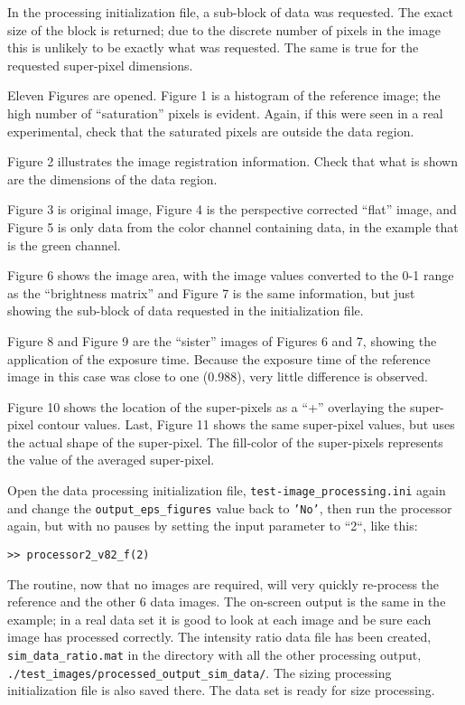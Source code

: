 In the processing initialization file, a sub-block of data was requested.  The exact size of the block is returned; due to the discrete number of pixels in the image this is unlikely to be exactly what was requested.  The same is true for the requested super-pixel dimensions.  

Eleven Figures are opened.  Figure 1 is a histogram of the reference image; the high number of ``saturation'' pixels is evident.  Again, if this were seen in a real experimental, check that the saturated pixels are outside the data region.

Figure 2 illustrates the image registration information.  Check that what is shown are the dimensions of the data region.

Figure 3 is original image, Figure 4 is the perspective corrected ``flat'' image, and Figure 5 is only data from the color channel containing data, in the example that is the green channel.

Figure 6 shows the image area, with the image values converted to the 0-1 range as the ``brightness matrix'' and Figure 7 is the same information, but just showing the sub-block of data requested in the initialization file.

Figure 8 and Figure 9 are the ``sister'' images of Figures 6 and 7, showing the application of the exposure time.  Because the exposure time of the reference image in this case was close to one (0.988), very little difference is observed.  

Figure 10 shows the location of the super-pixels as a ``+'' overlaying the super-pixel contour values.  Last, Figure 11 shows the same super-pixel values, but uses the actual shape of the super-pixel.  The fill-color of the super-pixels represents the value of the averaged super-pixel.

Open the data processing initialization file, \texttt{test-image\_processing.ini} again and change the \texttt{output\_eps\_figures} value back to \texttt{'No'}, then run the processor again, but with no pauses by setting the input parameter to ``2``, like this:

\begin{verbatim}
>> processor2_v82_f(2)
\end{verbatim}

The routine, now that no images are required, will very quickly re-process the reference and the other 6 data images. The on-screen output is the same in the example; in a real data set it is good to look at each image and be sure each image has processed correctly.  The intensity ratio data file has been created, \texttt{sim\_data\_ratio.mat} in the directory with all the other processing output, \texttt{./test\_images/processed\_output\_sim\_data/}.  The sizing processing initialization file is also saved there.  The data set is ready for size processing.

